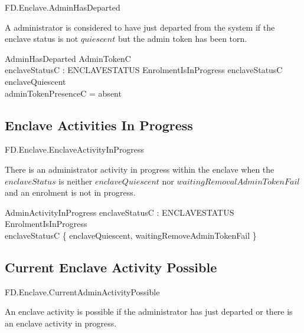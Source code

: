 \begin{traceunit}{FD.Enclave.AdminHasDeparted}
\end{traceunit}


A administrator is considered to have just departed from the system
if the enclave status is not $quiescent$ but the admin token has been torn.

\begin{schema}{AdminHasDeparted}
        AdminTokenC
\\      enclaveStatusC : ENCLAVESTATUS
\where
        \lnot EnrolmentIsInProgress
\also
        enclaveStatusC \neq enclaveQuiescent
\\      adminTokenPresenceC = absent
\end{schema}



\subsection{Enclave Activities In Progress}

\begin{traceunit}{FD.Enclave.EnclaveActivityInProgress}
\end{traceunit}

There is an administrator activity in progress within the enclave when the
$enclaveStatus$ is neither $enclaveQuiescent$ nor
$waitingRemovalAdminTokenFail$ and an enrolment is not in progress.

\begin{schema}{AdminActivityInProgress}
        enclaveStatusC : ENCLAVESTATUS
\where
        \lnot EnrolmentIsInProgress
\\      enclaveStatusC \notin \{ enclaveQuiescent, waitingRemoveAdminTokenFail \}
\end{schema}



\subsection{Current Enclave Activity Possible}

\begin{traceunit}{FD.Enclave.CurrentAdminActivityPossible}
\end{traceunit}

An enclave activity is possible if the administrator has just departed or
there is an enclave activity in progress.

